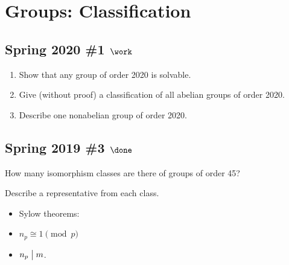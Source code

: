 \hypertarget{groups-classification}{%
\section{Groups: Classification}\label{groups-classification}}

\hypertarget{spring-2020-1-work}{%
\subsection{\texorpdfstring{Spring 2020 \#1
\(\work\)}{Spring 2020 \#1 \textbackslash work}}\label{spring-2020-1-work}}

\begin{enumerate}
\def\labelenumi{\alph{enumi}.}
\item
  Show that any group of order 2020 is solvable.
\item
  Give (without proof) a classification of all abelian groups of order
  2020.
\item
  Describe one nonabelian group of order 2020.
\end{enumerate}


\hypertarget{spring-2019-3-done}{%
\subsection{\texorpdfstring{Spring 2019 \#3
\(\done\)}{Spring 2019 \#3 \textbackslash done}}\label{spring-2019-3-done}}

How many isomorphism classes are there of groups of order 45?

Describe a representative from each class.

\begin{concept}

\envlist

\begin{itemize}
\tightlist
\item
  Sylow theorems:
\item
  \(n_p \cong 1 \pmod p\)
\item
  \(n_p \bigm|m\).
\end{itemize}

\end{concept}

